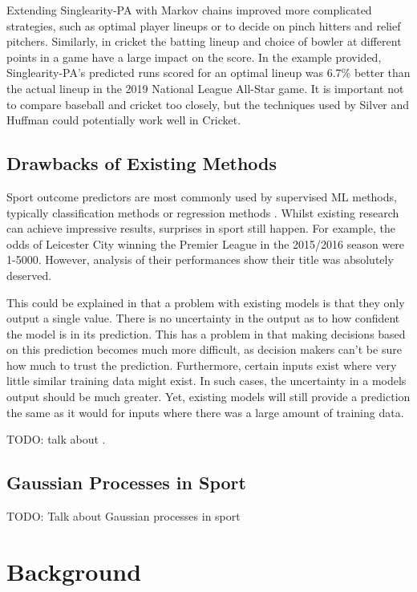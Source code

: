 \documentclass[12pt,a4paper]{report}
\theoremstyle{definition}
\begin{document}
Extending Singlearity-PA with Markov chains improved more complicated strategies, such as optimal player lineups or to decide on pinch hitters and relief pitchers. 
Similarly, in cricket the batting lineup and choice of bowler at different points in a game have a large impact on the score. 
In the example provided, Singlearity-PA's predicted runs scored for an optimal lineup was 6.7\% better than the actual lineup in the 2019 National League All-Star game. 
It is important not to compare baseball and cricket too closely, but the techniques used by Silver and Huffman could potentially work well in Cricket.

\section{Drawbacks of Existing Methods}

Sport outcome predictors are most commonly used by supervised ML methods, typically classification methods or regression methods \citep{horvat2020}. 
Whilst existing research can achieve impressive results, surprises in sport still happen. For example, the odds of Leicester City winning the Premier League in the 2015/2016 season were 1-5000. 
However, analysis of their performances show their title was absolutely deserved.

This could be explained in that a problem with existing models is that they only output a single value. 
There is no uncertainty in the output as to how confident the model is in its prediction. 
This has a problem in that making decisions based on this prediction becomes much more difficult, as decision makers can't be sure how much to trust the prediction. 
Furthermore, certain inputs exist where very little similar training data might exist. 
In such cases, the uncertainty in a models output should be much greater. 
Yet, existing models will still provide a prediction the same as it would for inputs where there was a large amount of training data.

 TODO: talk about \citep{Blumberg2020}.

\section{Gaussian Processes in Sport}

TODO: Talk about Gaussian processes in sport

\chapter{Background}
\end{document}

